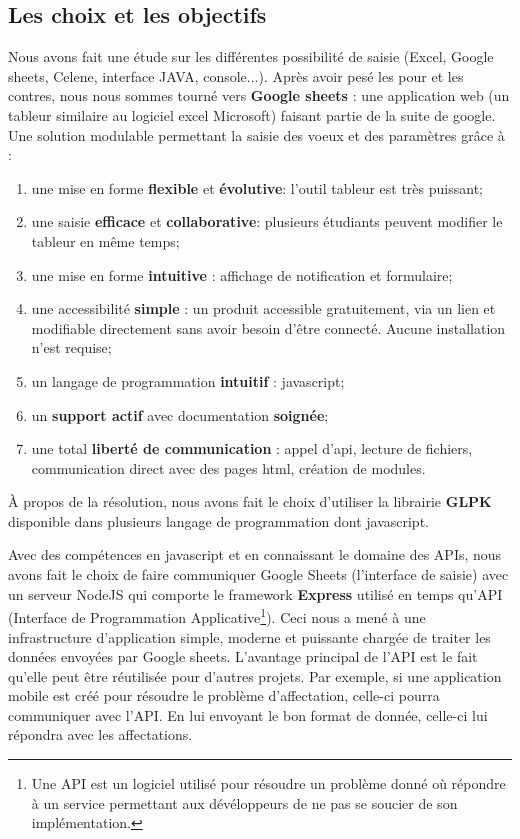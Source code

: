 \documentclass[final,poster]{polytech/polytech}
\begin{document}
\subsection{Les choix et les objectifs}
Nous avons fait une étude sur les différentes possibilité de saisie (Excel, Google sheets, Celene, interface JAVA, console...).
Après avoir pesé les pour et les contres, nous nous sommes tourné vers \textbf{Google sheets} : une application web (un tableur similaire au logiciel excel Microsoft) faisant partie de la suite de google.
Une solution modulable permettant la saisie des voeux et des paramètres grâce à :
\begin{enumerate}
\item une mise en forme \textbf{flexible} et \textbf{évolutive}: l'outil tableur est très puissant;
\item une saisie \textbf{efficace} et \textbf{collaborative}: plusieurs étudiants peuvent modifier le tableur en même temps;
\item une mise en forme \textbf{intuitive} : affichage de notification et formulaire;
\item une accessibilité \textbf{simple} : un produit accessible gratuitement, via un lien et modifiable directement sans avoir besoin d'être connecté. Aucune installation n’est requise;
\item un langage de programmation \textbf{intuitif} : javascript;
\item un \textbf{support actif} avec documentation \textbf{soignée};
\item une total \textbf{liberté de communication} : appel d’api, lecture de fichiers, communication direct avec des pages html, création de modules.
\end{enumerate}

À propos de la résolution, nous avons fait le choix d’utiliser la librairie \textbf{GLPK} disponible dans plusieurs langage de programmation dont javascript. 

Avec des compétences en javascript et en connaissant le domaine des APIs, nous avons fait le choix de faire communiquer Google Sheets (l’interface de saisie) avec un serveur NodeJS qui comporte le framework \textbf{Express} utilisé en temps qu’API (Interface de Programmation Applicative\footnote{Une API est un logiciel utilisé pour résoudre un problème donné où répondre à un service permettant aux dévéloppeurs de ne pas se soucier de son implémentation.}).
 Ceci nous a mené à une  infrastructure d’application simple, moderne et puissante chargée de traiter les données envoyées par Google sheets.
L’avantage principal de l’API est le fait qu’elle peut être réutilisée pour d’autres projets. 
Par exemple, si une application mobile est créé pour résoudre le problème d’affectation, celle-ci pourra communiquer avec l’API.
En lui envoyant le bon format de donnée, celle-ci lui répondra avec les affectations. 
\end{document}
